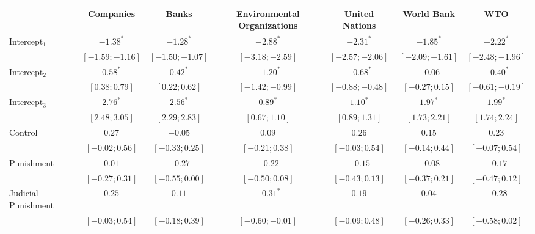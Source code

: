 \usepackage{threeparttable}

\begin{table}
\begin{center}
\begin{threeparttable}
\begin{tabular}{l c c c c c c}
\hline
 & Companies & Banks & Environmental Organizations & United Nations & World Bank & WTO \\
\hline
Intercept$_1$       & $-1.38^{*}$       & $-1.28^{*}$       & $-2.88^{*}$       & $-2.31^{*}$       & $-1.85^{*}$       & $-2.22^{*}$       \\
                    & $ [-1.59; -1.16]$ & $ [-1.50; -1.07]$ & $ [-3.18; -2.59]$ & $ [-2.57; -2.06]$ & $ [-2.09; -1.61]$ & $ [-2.48; -1.96]$ \\
Intercept$_2$       & $0.58^{*}$        & $0.42^{*}$        & $-1.20^{*}$       & $-0.68^{*}$       & $-0.06$           & $-0.40^{*}$       \\
                    & $ [ 0.38;  0.79]$ & $ [ 0.22;  0.62]$ & $ [-1.42; -0.99]$ & $ [-0.88; -0.48]$ & $ [-0.27;  0.15]$ & $ [-0.61; -0.19]$ \\
Intercept$_3$       & $2.76^{*}$        & $2.56^{*}$        & $0.89^{*}$        & $1.10^{*}$        & $1.97^{*}$        & $1.99^{*}$        \\
                    & $ [ 2.48;  3.05]$ & $ [ 2.29;  2.83]$ & $ [ 0.67;  1.10]$ & $ [ 0.89;  1.31]$ & $ [ 1.73;  2.21]$ & $ [ 1.74;  2.24]$ \\
Control             & $0.27$            & $-0.05$           & $0.09$            & $0.26$            & $0.15$            & $0.23$            \\
                    & $ [-0.02;  0.56]$ & $ [-0.33;  0.25]$ & $ [-0.21;  0.38]$ & $ [-0.03;  0.54]$ & $ [-0.14;  0.44]$ & $ [-0.07;  0.54]$ \\
Punishment          & $0.01$            & $-0.27$           & $-0.22$           & $-0.15$           & $-0.08$           & $-0.17$           \\
                    & $ [-0.27;  0.31]$ & $ [-0.55;  0.00]$ & $ [-0.50;  0.08]$ & $ [-0.43;  0.13]$ & $ [-0.37;  0.21]$ & $ [-0.47;  0.12]$ \\
Judicial Punishment & $0.25$            & $0.11$            & $-0.31^{*}$       & $0.19$            & $0.04$            & $-0.28$           \\
                    & $ [-0.03;  0.54]$ & $ [-0.18;  0.39]$ & $ [-0.60; -0.01]$ & $ [-0.09;  0.48]$ & $ [-0.26;  0.33]$ & $ [-0.58;  0.02]$ \\

\end{tabular}
\end{threeparttable}
\end{center}
\end{table}
